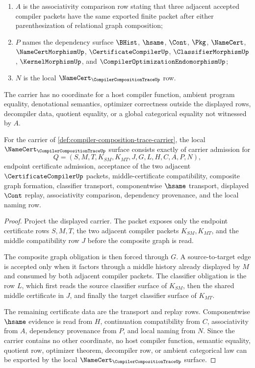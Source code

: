 \begin{definition}
\begin{enumerate}
\item $A$ is the associativity comparison row stating that three adjacent accepted compiler packets have the same exported finite packet after either parenthesization of relational graph composition;
\item $P$ names the dependency surface $\BHist$, $\hsame$, $\Cont$, $\Pkg$, $\NameCert$, $\NameCertMorphismUp$, $\CertificateCompilerUp$, $\ClassifierMorphismUp$, $\KernelMorphismUp$, and $\CompilerOptimizationEndomorphismUp$;
\item $N$ is the local $\NameCert_{\CompilerCompositionTraceUp}$ row.
\end{enumerate}
The carrier has no coordinate for a host compiler function, ambient program equality, denotational semantics, optimizer correctness outside the displayed rows, decompiler data, quotient equality, or a global categorical equality not witnessed by $A$.
\end{definition}

\begin{theorem}
\label{thm:compiler-composition-trace-namecert-obligations}
For the carrier of \autoref{def:compiler-composition-trace-carrier}, the local $\NameCert_{\CompilerCompositionTraceUp}$ surface consists exactly of carrier admission for
$$
Q=(S,M,T,K_{SM},K_{MT},J,G,L,H,C,A,P,N),
$$
endpoint certificate admission, acceptance of the two adjacent $\CertificateCompilerUp$ packets, middle-certificate compatibility, composite graph formation, classifier transport, componentwise $\hsame$ transport, displayed $\Cont$ replay, associativity comparison, dependency provenance, and the local naming row.
\end{theorem}
\begin{proof}
Project the displayed carrier. The packet exposes only the endpoint certificate rows $S,M,T$, the two adjacent compiler packets $K_{SM},K_{MT}$, and the middle compatibility row $J$ before the composite graph is read.

The composite graph obligation is then forced through $G$. A source-to-target edge is accepted only when it factors through a middle history already displayed by $M$ and consumed by both adjacent compiler packets. The classifier obligation is the row $L$, which first reads the source classifier surface of $K_{SM}$, then the shared middle certificate in $J$, and finally the target classifier surface of $K_{MT}$.

The remaining certificate data are the transport and replay rows. Componentwise $\hsame$ evidence is read from $H$, continuation compatibility from $C$, associativity from $A$, dependency provenance from $P$, and local naming from $N$. Since the carrier contains no other coordinate, no host compiler function, semantic equality, quotient row, optimizer theorem, decompiler row, or ambient categorical law can be exported by the local $\NameCert_{\CompilerCompositionTraceUp}$ surface.
\end{proof}

